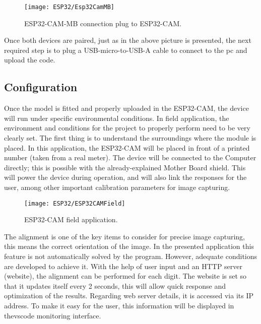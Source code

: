 \begin{figure}  
	\begin{center}
		\texttt{[image: ESP32/Esp32CamMB]}
		\caption{ESP32-CAM-MB connection plug to ESP32-CAM.} 
		\label{fig:ESP32-CAM-MB connection plug to ESP32-CAM.}
	\end{center}
\end{figure}	


Once both devices are paired, just as in the above picture is presented, the next required step is to plug a USB-micro-to-USB-A cable to connect to the \ac{pc} and upload the code.  

\subsection{Configuration}

Once the model is fitted and properly uploaded in the ESP32-CAM, the device will run under specific environmental conditions. In field application, the environment and conditions for the project to properly perform need to be very clearly set. The first thing is to understand the surroundings where the module is placed. In this application, the ESP32-CAM will be placed in front of a printed number (taken from a real meter). The device will be connected to the Computer directly; this is possible with the already-explained Mother Board shield. This will power the device during operation, and will also link the responses for the user, among other important calibration parameters for image capturing. 

\begin{figure}  
	\begin{center}
		\texttt{[image: ESP32/ESP32CAMField]}
		\caption{ESP32-CAM field application.} 
		\label{fig:ESP32-CAM field application.}
	\end{center}
\end{figure}	


The alignment is one of the key items to consider for precise image capturing, this means the correct orientation of the image. In the presented application this feature is not automatically solved by the program. However, adequate conditions are developed to achieve it. With the help of user input and an HTTP server (website), the alignment can be performed for each digit. The website is set so that it updates itself every 2 seconds, this will allow quick response and optimization of the results. Regarding web server details, it is accessed via its IP address. To make it easy for the user, this information will be displayed in the\ac{vscode} monitoring interface.\\

